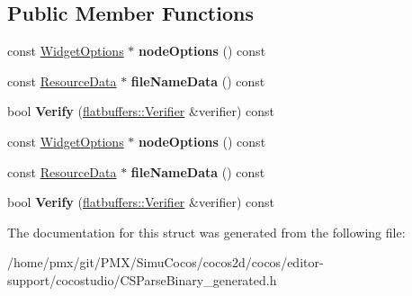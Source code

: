 \subsection*{Public Member Functions}
\begin{DoxyCompactItemize}
\item 
\mbox{\label{structflatbuffers_1_1GameMapOptions_ae18bd15e9fcd3bc09b2915e603c1ba50}} 
const \hyperlink{structflatbuffers_1_1WidgetOptions}{Widget\+Options} $\ast$ {\bfseries node\+Options} () const
\item 
\mbox{\label{structflatbuffers_1_1GameMapOptions_a833fa94cba6ee11df36f3f09cc182cbd}} 
const \hyperlink{structflatbuffers_1_1ResourceData}{Resource\+Data} $\ast$ {\bfseries file\+Name\+Data} () const
\item 
\mbox{\label{structflatbuffers_1_1GameMapOptions_a1d00b6feb98b90475202c525896073bb}} 
bool {\bfseries Verify} (\hyperlink{classflatbuffers_1_1Verifier}{flatbuffers\+::\+Verifier} \&verifier) const
\item 
\mbox{\label{structflatbuffers_1_1GameMapOptions_ae18bd15e9fcd3bc09b2915e603c1ba50}} 
const \hyperlink{structflatbuffers_1_1WidgetOptions}{Widget\+Options} $\ast$ {\bfseries node\+Options} () const
\item 
\mbox{\label{structflatbuffers_1_1GameMapOptions_a833fa94cba6ee11df36f3f09cc182cbd}} 
const \hyperlink{structflatbuffers_1_1ResourceData}{Resource\+Data} $\ast$ {\bfseries file\+Name\+Data} () const
\item 
\mbox{\label{structflatbuffers_1_1GameMapOptions_a1d00b6feb98b90475202c525896073bb}} 
bool {\bfseries Verify} (\hyperlink{classflatbuffers_1_1Verifier}{flatbuffers\+::\+Verifier} \&verifier) const
\end{DoxyCompactItemize}


The documentation for this struct was generated from the following file\+:\begin{DoxyCompactItemize}
\item 
/home/pmx/git/\+P\+M\+X/\+Simu\+Cocos/cocos2d/cocos/editor-\/support/cocostudio/C\+S\+Parse\+Binary\+\_\+generated.\+h\end{DoxyCompactItemize}
